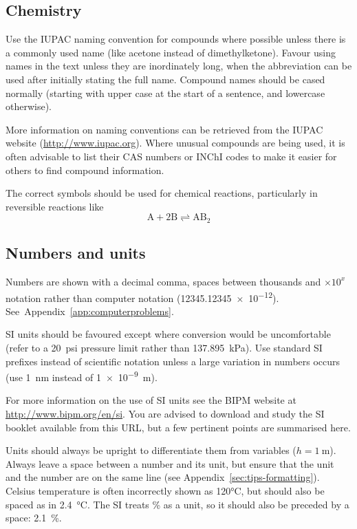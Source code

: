 \documentclass[a5paper, 10pt]{article}
\begin{document}
\subsection{Chemistry}
Use the IUPAC naming convention for compounds where possible unless
there is a commonly used name (like acetone instead of
dimethylketone).  Favour using names in the text unless they are
inordinately long, when the abbreviation can be used after initially
stating the full name.  Compound names should be cased normally
(starting with upper case at the start of a sentence, and lowercase
otherwise).

More information on naming conventions can be retrieved from the IUPAC
website (\url{http://www.iupac.org}).  Where unusual compounds are being used, it is often advisable to list their CAS numbers or INChI codes to make it easier for others to find compound information.

The correct symbols should be used for chemical reactions,
particularly in reversible reactions like
\begin{displaymath}
  \mathrm{A} + 2\mathrm{B} \rightleftharpoons \mathrm{AB}_2
\end{displaymath}

\subsection{Numbers and units}
Numbers are shown with a decimal comma, spaces between thousands and
$\times 10^x$ notation rather than computer notation
(\num{12345.12345e-12}).  See~Appendix~\ref{app:computerproblems}.

SI units should be favoured except where conversion would be
uncomfortable (refer to a \SI{20}{psi} pressure limit rather than
\SI{137.895}{\kilo\pascal}).
Use standard
SI prefixes instead of scientific notation unless a large variation in
numbers occurs (use \SI{1}{\nano\meter} instead of \SI{1e-9}{\meter}).

For more information on the use of SI units see the BIPM website at \url{http://www.bipm.org/en/si}.  You are advised to download and study the SI booklet available from this URL, but a few pertinent points are summarised here.

Units should always be upright to differentiate them from variables ($h = \SI{1}{\meter}$).  
Always leave a space between a number and its
unit, but ensure that the unit and the number are on the same line
(see Appendix~\ref{sec:tips-formatting}).  Celsius temperature is
often incorrectly shown as 120\si{\celsius}, but should also be spaced
as in \SI{2.4}{\celsius}.  The SI treats \% as a unit, so it should also be preceded by a space: \SI{2.1}{\%}.
\end{document}
